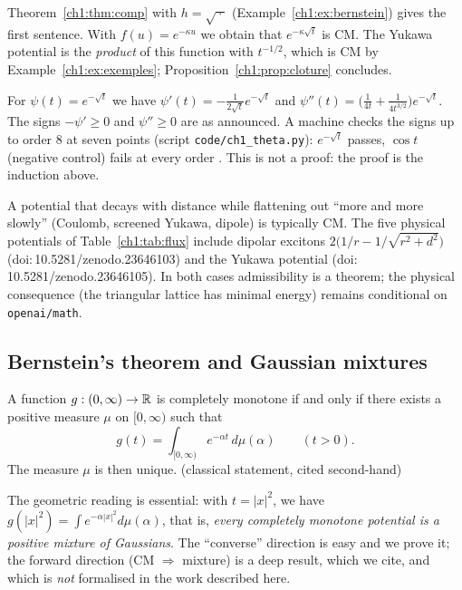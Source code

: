 \begin{humanproof}
Theorem~\ref{ch1:thm:comp} with $h=\sqrt{\ \cdot\ }$ (Example~\ref{ch1:ex:bernstein}) gives the first sentence. With $f(u)=e^{-\kappa u}$ we obtain that
$e^{-\kappa\sqrt t}$ is CM. The Yukawa potential is the \emph{product} of this function with $t^{-1/2}$, which is CM by Example~\ref{ch1:ex:exemples};
Proposition~\ref{ch1:prop:cloture} concludes.
\end{humanproof}

\begin{remark}
For $\psi(t)=e^{-\sqrt t}$ we have $\psi'(t)=-\frac{1}{2\sqrt t}e^{-\sqrt t}$ and $\psi''(t)=\bigl(\frac1{4t}+\frac1{4t^{3/2}}\bigr)e^{-\sqrt t}$. The signs
$-\psi'\ge0$ and $\psi''\ge0$ are as announced. A machine checks the signs up to order $8$ at seven points
(script \texttt{code/ch1\_theta.py}): $e^{-\sqrt t}$ passes, $\cos t$ (negative control) fails at every order \tierX{}. This is not a proof:
the proof is the induction above.
\end{remark}

\begin{physbox}
A potential that decays with distance while flattening out ``more and more slowly'' (Coulomb, screened Yukawa, dipole) is typically CM.
The five physical potentials of Table~\ref{ch1:tab:flux} include dipolar excitons $2\bigl(1/r-1/\sqrt{r^2+d^2}\bigr)$ (doi:\,10.5281/zenodo.23646103) and the Yukawa potential
(doi:\,10.5281/zenodo.23646105). In both cases admissibility is a \tierA{} theorem; the physical consequence (the triangular lattice has
minimal energy) remains conditional on \texttt{openai/math}.
\end{physbox}

\subsection{Bernstein's theorem and Gaussian mixtures}

\begin{theorem}\label{ch1:thm:bernstein}
A function $g:(0,\infty)\to\mathbb{R}$ is completely monotone if and only if there exists a positive measure $\mu$ on $[0,\infty)$ such that
\[
  g(t)=\int_{[0,\infty)}e^{-\alpha t}\,d\mu(\alpha)\qquad(t>0).
\]
The measure $\mu$ is then unique. \tierL{} (classical statement, cited second-hand)~\cite{bernstein,widder}
\end{theorem}

The geometric reading is essential: with $t=|x|^2$, we have $g(|x|^2)=\int e^{-\alpha|x|^2}d\mu(\alpha)$, that is, \emph{every completely monotone potential
is a positive mixture of Gaussians}. The ``converse'' direction is easy and we prove it; the forward direction (CM $\Rightarrow$ mixture) is a deep
result, which we cite, and which is \emph{not} formalised in the work described here.

